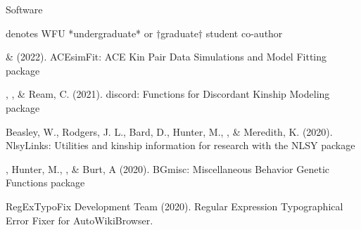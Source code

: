 \begin{rSection}{\textrm{Software}}%
\vspace{-1mm}\begin{center}\footnotesize{denotes WFU *undergraduate* or $\dagger$graduate$\dagger$ student co-author}\end{center}\vspace{-1mm}

\begin{etaremune}
\item \xyl   \& \meb (2022). ACEsimFit: ACE Kin Pair Data Simulations and Model Fitting \R package 
\item\meb, \jt, \& Ream, C. (2021). discord: Functions for Discordant Kinship Modeling \R package 
%
%
%
\item  Beasley, W., Rodgers, J. L., Bard, D., Hunter, M., \meb, \& Meredith, K. (2020). NlsyLinks: Utilities and kinship information for research with the NLSY \R package %
%
%
\item\meb, Hunter, M., \jt, \& Burt, A (2020). BGmisc: Miscellaneous Behavior Genetic Functions \R package %

\item RegExTypoFix Development Team (2020). Regular Expression Typographical Error Fixer for Auto\allowbreak WikiBrowser. 
%
%
%
\end{etaremune}
\end{rSection}

